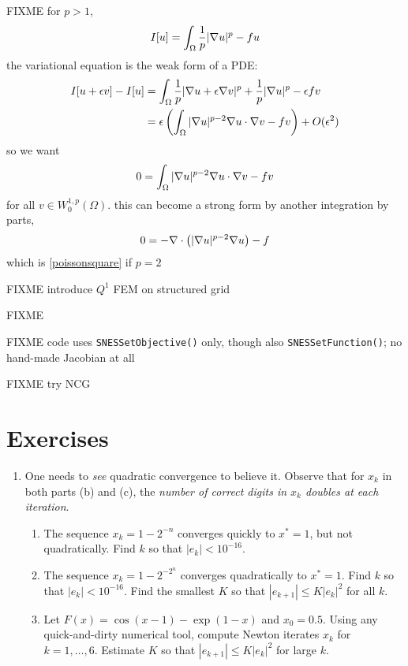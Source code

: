FIXME for $p>1$,
    $$I[u] = \int_\Omega \frac{1}{p} |\nabla u|^p - fu$$
the variational equation is the weak form of a PDE:
\begin{align*}
I[u+\epsilon v] - I[u] &= \int_\Omega \frac{1}{p} |\nabla u + \epsilon \nabla v|^p + \frac{1}{p} |\nabla u|^p - \epsilon f v \\
   &= \epsilon \left(\int_\Omega |\nabla u|^{p-2} \nabla u \cdot \nabla v - f v\right) + O(\epsilon^2)
\end{align*}
so we want
    $$0 = \int_\Omega |\nabla u|^{p-2} \nabla u \cdot \nabla v - f v$$
for all $v \in W^{1,p}_0(\Omega)$.  this can become a strong form by another integration by parts,
    $$0 = - \nabla\cdot\left(|\nabla u|^{p-2} \nabla u\right) - f$$
which is \eqref{poissonsquare} if $p=2$

FIXME introduce $Q^1$ FEM on structured grid

\begin{marginfigure}

\caption{FIXME}
\label{fig:q1hat}
\end{marginfigure}

FIXME code uses \texttt{SNESSetObjective()} only, though also \texttt{SNESSetFunction()}; no hand-made Jacobian at all

FIXME try NCG


\section{Exercises}

\renewcommand{\labelenumi}{\arabic{chapter}.\arabic{enumi}\quad}
\renewcommand{\labelenumii}{(\alph{enumii})}
\begin{enumerate}
\item One needs to \emph{see} quadratic convergence to believe it.  Observe that for $x_k$ in both parts (b) and (c), the \emph{number of correct digits in $x_k$ doubles at each iteration}. \begin{enumerate}
    \item The sequence $x_k = 1-2^{-n}$ converges quickly to $x^*=1$, but not quadratically.  Find $k$ so that $|e_k| < 10^{-16}$.
    \item The sequence $x_k = 1-2^{-2^n}$ converges quadratically to $x^*=1$.  Find $k$ so that $|e_k| < 10^{-16}$.  Find the smallest $K$ so that $|e_{k+1}| \le K |e_k|^2$ for all $k$.
    \item Let $F(x) = \cos(x-1) - \exp(1-x)$ and $x_0=0.5$.  Using any quick-and-dirty numerical tool, compute Newton iterates $x_k$ for $k=1,\dots,6$.  Estimate $K$ so that $|e_{k+1}| \le K |e_k|^2$ for large $k$.
    \end{enumerate}
\end{enumerate}